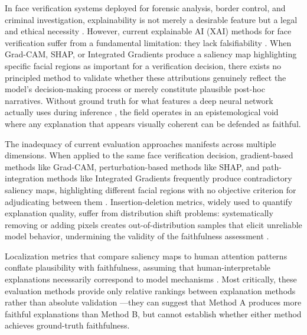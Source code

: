 In face verification systems deployed for forensic analysis, border control, and criminal investigation, explainability is not merely a desirable feature but a legal and ethical necessity \cite{wachter2017right,selbst2018intuitive}. However, current explainable AI (XAI) methods for face verification suffer from a fundamental limitation: they lack falsifiability \cite{popper1959logic}. When Grad-CAM, SHAP, or Integrated Gradients produce a saliency map highlighting specific facial regions as important for a verification decision, there exists no principled method to validate \cite{krishna2022disagreement,zhou2022evaluating} whether these attributions genuinely reflect the model's decision-making process or merely constitute plausible post-hoc narratives. Without ground truth for what features a deep neural network actually uses during inference \cite{doshivelez2017rigorous}, the field operates in an epistemological void where any explanation that appears visually coherent can be defended as faithful.

The inadequacy of current evaluation approaches manifests across multiple dimensions. When applied to the same face verification decision, gradient-based methods like Grad-CAM, perturbation-based methods like SHAP, and path-integration methods like Integrated Gradients frequently produce contradictory saliency maps, highlighting different facial regions with no objective criterion for adjudicating between them \cite{Adebayo2018_SanityChecks,tomsett2020sanity,krishna2022disagreement}. Insertion-deletion metrics, widely used to quantify explanation quality, suffer from distribution shift problems: systematically removing or adding pixels creates out-of-distribution samples that elicit unreliable model behavior, undermining the validity of the faithfulness assessment \cite{hooker2019benchmark,rong2022consistent}.

Localization metrics that compare saliency maps to human attention patterns conflate plausibility with faithfulness, assuming that human-interpretable explanations necessarily correspond to model mechanisms \cite{zhou2022evaluating,jacovi2020faithfully}. Most critically, these evaluation methods provide only relative rankings between explanation methods rather than absolute validation \cite{nauta2023quantitative,hedstrom2023quantus}---they can suggest that Method A produces more faithful explanations than Method B, but cannot establish whether either method achieves ground-truth faithfulness.

